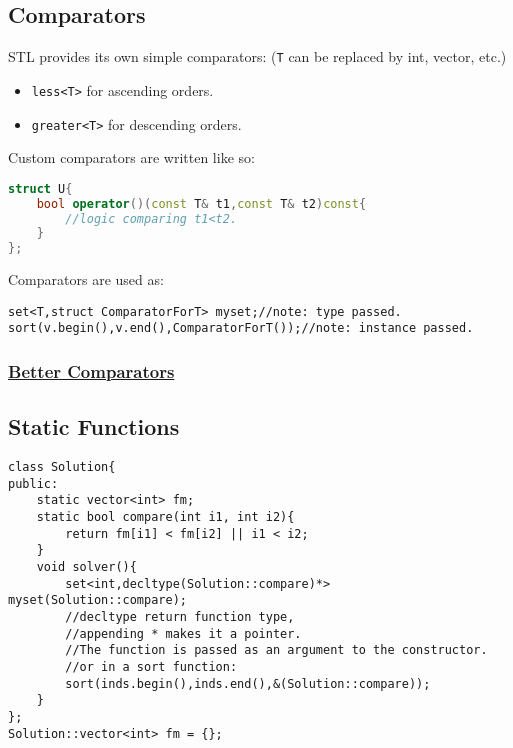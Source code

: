 \documentclass{article}
\begin{document}
\subsection{Comparators}
STL provides its own simple comparators: (\texttt{T} can be replaced by
int, vector, etc.)
\begin{itemize}
    \item \texttt{less<T>} for ascending orders.
    \item \texttt{greater<T>} for descending orders.
\end{itemize} Custom comparators are written like so:
\begin{lstlisting}[caption={Comparators},language=C++]
struct U{
    bool operator()(const T& t1,const T& t2)const{
        //logic comparing t1<t2.
    }
};
\end{lstlisting}
Comparators are used as:
\begin{lstlisting}
set<T,struct ComparatorForT> myset;//note: type passed.
sort(v.begin(),v.end(),ComparatorForT());//note: instance passed.
\end{lstlisting}
\subsubsection{\href{https://stackoverflow.com/a/46128321/14681493}{Better Comparators}}
\subsection*{Static Functions}
\begin{lstlisting}
class Solution{
public:
    static vector<int> fm;
    static bool compare(int i1, int i2){
        return fm[i1] < fm[i2] || i1 < i2;
    }
    void solver(){
        set<int,decltype(Solution::compare)*> myset(Solution::compare);
        //decltype return function type,
        //appending * makes it a pointer.
        //The function is passed as an argument to the constructor.
        //or in a sort function:
        sort(inds.begin(),inds.end(),&(Solution::compare));
    }
};
Solution::vector<int> fm = {};
\end{lstlisting}
\end{document}
